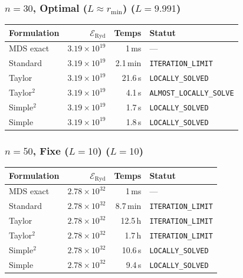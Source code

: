 \subsubsection{$n=30$, Optimal ($L{\approx}r_{\min}$) ($L=9.991$)}
\begin{longtable}{@{}lrrl@{}}
  \toprule
  Formulation & $\mathcal{E}_{\mathrm{Ryd}}$ & Temps & Statut \\
  \midrule
  \endhead
  MDS exact & $3.19\times10^{19}$ & 1\,ms & --- \\
  Standard & $3.19\times10^{19}$ & 2.1\,min & \texttt{ITERATION\_LIMIT} \\
  Taylor & $3.19\times10^{19}$ & 21.6\,s & \texttt{LOCALLY\_SOLVED} \\
  Taylor$^2$ & $3.19\times10^{19}$ & 4.1\,s & \texttt{ALMOST\_LOCALLY\_SOLVE} \\
  Simple$^2$ & $3.19\times10^{19}$ & 1.7\,s & \texttt{LOCALLY\_SOLVED} \\
  Simple & $3.19\times10^{19}$ & 1.8\,s & \texttt{LOCALLY\_SOLVED} \\
  \bottomrule
\end{longtable}

\subsubsection{$n=50$, Fixe ($L{=}10$) ($L=10$)}
\begin{longtable}{@{}lrrl@{}}
  \toprule
  Formulation & $\mathcal{E}_{\mathrm{Ryd}}$ & Temps & Statut \\
  \midrule
  \endhead
  MDS exact & $2.78\times10^{32}$ & 1\,ms & --- \\
  Standard & $2.78\times10^{32}$ & 8.7\,min & \texttt{ITERATION\_LIMIT} \\
  Taylor & $2.78\times10^{32}$ & 12.5\,h & \texttt{ITERATION\_LIMIT} \\
  Taylor$^2$ & $2.78\times10^{32}$ & 1.7\,h & \texttt{ITERATION\_LIMIT} \\
  Simple$^2$ & $2.78\times10^{32}$ & 10.6\,s & \texttt{LOCALLY\_SOLVED} \\
  Simple & $2.78\times10^{32}$ & 9.4\,s & \texttt{LOCALLY\_SOLVED} \\
  \bottomrule
\end{longtable}

